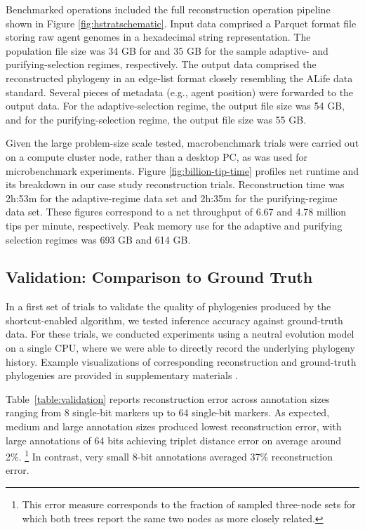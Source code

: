 Benchmarked operations included the full reconstruction operation pipeline shown in Figure \ref{fig:hstratschematic}.
Input data comprised a Parquet format file storing raw agent genomes in a hexadecimal string representation.
The population file size was 34 GB for and 35 GB for the sample adaptive- and purifying-selection regimes, respectively.
The output data comprised the reconstructed phylogeny in an edge-list format closely resembling the ALife data standard.
Several pieces of metadata (e.g., agent position) were forwarded to the output data.
For the adaptive-selection regime, the output file size was 54 GB, and for the purifying-selection regime, the output file size was 55 GB.

Given the large problem-size scale tested, macrobenchmark trials were carried out on a compute cluster node, rather than a desktop PC, as was used for microbenchmark experiments.
Figure \ref{fig:billion-tip-time} profiles net runtime and its breakdown in our case study reconstruction trials.
Reconstruction time was 2h:53m for the adaptive-regime data set and 2h:35m for the purifying-regime data set.
These figures correspond to a net throughput of 6.67 and 4.78 million tips per minute, respectively.
Peak memory use for the adaptive and purifying selection regimes was 693 GB and 614 GB.

\subsection{Validation: Comparison to Ground Truth}

In a first set of trials to validate the quality of phylogenies produced by the shortcut-enabled algorithm, we tested inference accuracy against ground-truth data.
For these trials, we conducted experiments using a neutral evolution model on a single CPU, where we were able to directly record the underlying phylogeny history.
Example visualizations of corresponding reconstruction and ground-truth phylogenies are provided in supplementary materials \citep{supplemental}.



Table~\ref{table:validation} reports reconstruction error across annotation sizes ranging from 8 single-bit markers up to 64 single-bit markers.
As expected, medium and large annotation sizes produced lowest reconstruction error, with large annotations of 64 bits achieving triplet distance error on average around 2\%.%
\footnote{This error measure corresponds to the fraction of sampled three-node sets for which both trees report the same two nodes as more closely related.}
In contrast, very small 8-bit annotations averaged 37\% reconstruction error.

